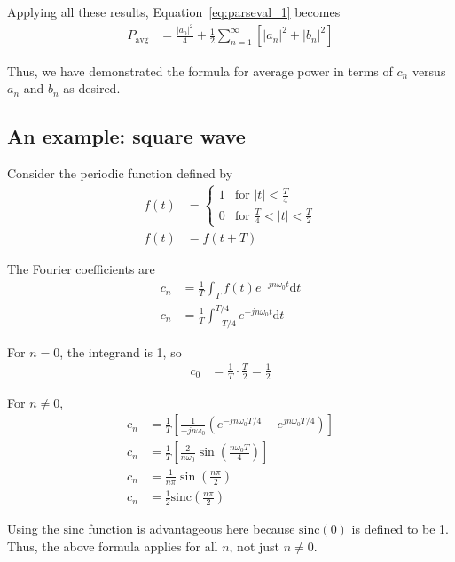 \documentclass[twocolumn]{myarticle}
\newcommand{\sinc}{\text{sinc}}
\renewcommand{\d}{\mathrm{d}}
\begin{document}
Applying all these results, Equation~\ref{eq:parseval_1} becomes
\begin{align}
    P_\text{avg} &= \frac{|a_0|^2}{4} + \frac{1}{2} \sum_{n = 1}^{\infty} \left[ \left| a_n \right|^2 + \left| b_n \right|^2 \right]
\end{align}

Thus, we have demonstrated the formula for average power in terms of $ c_n $ versus $ a_n $ and $ b_n $ as desired.

\subsection{An example: square wave}
\label{subsec:an_example_square_wave}

Consider the periodic function defined by
\begin{align}
    f(t) &= \begin{cases} 1 & \text{for } |t| < \frac{T}{4} \\ 0 & \text{for } \frac{T}{4} < |t| < \frac{T}{2} \end{cases}
    \\
    f(t) &= f(t + T)
\end{align}

The Fourier coefficients are
\begin{align}
    c_n &= \frac{1}{T} \int_{T} f(t) e^{-j n \omega_0 t} \d t
    \\
    c_n &= \frac{1}{T} \int_{-T/4}^{T/4} e^{-j n \omega_0 t} \d t
\end{align}

For $ n = 0 $, the integrand is 1, so
\begin{align}
    c_0 &= \frac{1}{T} \cdot \frac{T}{2} = \frac{1}{2}
\end{align}

For $ n \neq 0 $,
\begin{align}
    c_n &= \frac{1}{T} \left[ \frac{1}{-j n \omega_0} \left( e^{-j n \omega_0 T/4} - e^{jn \omega_0 T/4} \right) \right]
    \\
    c_n &= \frac{1}{T} \left[ \frac{2}{ n \omega_0} \sin\left(\frac{n \omega_0 T}{4} \right) \right]
    \\
    c_n &= \frac{1}{n \pi} \sin\left(\frac{n \pi}{2} \right)
    \\
    c_n &= \frac{1}{2} \sinc\left(\frac{n \pi}{2} \right)
\end{align}

Using the $ \sinc $ function is advantageous here because $ \sinc(0) $ is defined to be 1. 
Thus, the above formula applies for all $ n $, not just $ n \neq 0 $. 
\end{document}
